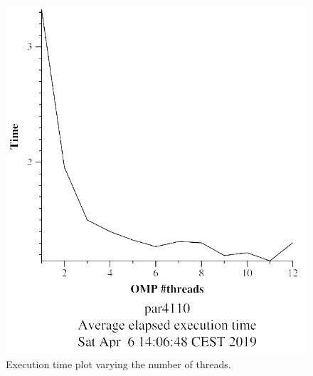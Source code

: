 \documentclass[12pt, a4paper]{article}
\begin{document}
\begin{figure}[H]
\centering
\begin{minipage}[b]{0.4\linewidth}
  \centering
  \includegraphics[scale=0.5]{./mandel-omp-10000-strong-23-time}
  \caption{Execution time plot varying the number of threads.}
  \label{fig:mandel-omp-10000-strong-23-time}
\end{minipage}%
\hspace{0.5cm}
\begin{minipage}[b]{0.4\linewidth}
  \centering

\end{minipage}
\end{figure}
\end{document}
